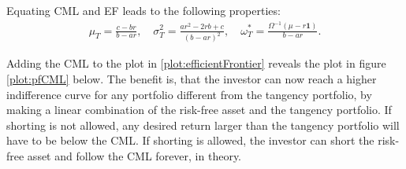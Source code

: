 \documentclass[11pt,a4paper,oneside]{article}
\newcommand{\lp}{\left(}
\newcommand{\rp}{\right)}
\begin{document}
Equating CML and EF leads to the following properties:
\begin{align}
    \mu_T = \frac{c - br}{b - ar}, \quad \sigma_T^2 = \frac{ar^2 - 2rb + c}{\lp b - ar\rp^2}, \quad \omega^*_T = \frac{\Omega^{-1}\lp \mu - r\mathbf{1}\rp}{b - ar}.
\end{align}

Adding the CML to the plot in \ref{plot:efficientFrontier} reveals the plot in figure \ref{plot:pfCML} below. The benefit is, that the investor can now reach a higher indifference curve for any portfolio different from the tangency portfolio, by making a linear combination of the risk-free asset and the tangency portfolio. If shorting is not allowed, any desired return larger than the tangency portfolio will have to be below the CML. If shorting is allowed, the investor can short the risk-free asset and follow the CML forever, in theory.


\printbibliography[heading=none]
\end{document}
